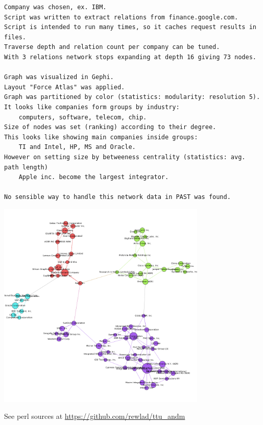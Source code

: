 \documentclass{article}
\begin{document}
\begin{verbatim}
Company was chosen, ex. IBM.
Script was written to extract relations from finance.google.com.
Script is intended to run many times, so it caches request results in files.
Traverse depth and relation count per company can be tuned.
With 3 relations network stops expanding at depth 16 giving 73 nodes.

Graph was visualized in Gephi.
Layout "Force Atlas" was applied.
Graph was partitioned by color (statistics: modularity: resolution 5).
It looks like companies form groups by industry:
    computers, software, telecom, chip.
Size of nodes was set (ranking) according to their degree.
This looks like showing main companies inside groups:
    TI and Intel, HP, MS and Oracle.
However on setting size by betweeness centrality (statistics: avg. path length)
    Apple inc. become the largest integrator.

No sensible way to handle this network data in PAST was found.

\end{verbatim}

\includegraphics[width=100mm]{itcomp.png}

\clearpage

See perl sources at \url{https://github.com/rewlad/ttu_andm}


\end{document}
